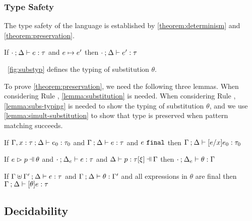 \subsubsection{Type Safety}
The type safety of the language is established by
\autoref{theorem:determinism} and \autoref{theorem:preservation}.

\begin{theorem}[Preservation]
  \label{theorem:preservation}
  If $\cdot \mathbin{;} \Delta \vdash e : \tau$ and $e \mapsto e'$
  then $\cdot \mathbin{;} \Delta \vdash e' : \tau$
\end{theorem}



\figurename~\ref{fig:substyp} defines the typing of substitution $\theta$.

To prove \autoref{theorem:preservation}, we need the following three lemmas.
When considering Rule \ITAp, \autoref{lemma:substitution} is needed.
When considering Rule \ITSuccMatch, \autoref{lemma:subs-typing} is needed
to show the typing of substitution $\theta$, and we use
\autoref{lemma:simult-substitution} to show that type is preserved when pattern
matching succeeds.

\begin{lemma}[Substitution]
  \label{lemma:substitution}
  If $\Gamma, x : \tau \mathbin{;} \Delta \vdash e_0 : \tau_0$ and $\Gamma \mathbin{;} \Delta \vdash e : \tau$ and $e ~\mathtt{final}$
  then $\Gamma \mathbin{;} \Delta \vdash [e/x]e_0 : \tau_0$
\end{lemma}

\begin{lemma}
  \label{lemma:subs-typing}
  If $\hpatmatch{e}{p}{\theta}$ and $\cdot \mathbin{;} \Delta_e \vdash e : \tau$ and $\chpattyp{p}{\tau}{\xi}{\Gamma}{\Delta}$ then $\cdot \mathbin{;} \Delta_e \vdash \theta : \Gamma$
\end{lemma}

\begin{lemma}
  \label{lemma:simult-substitution}
  If $\Gamma \uplus \Gamma' \mathbin{;} \Delta \vdash e : \tau$ and $\Gamma \mathbin{;} \Delta \vdash \theta : \Gamma'$ and all expressions in $\theta$ are final
  then $\Gamma \mathbin{;} \Delta \vdash [\theta]e : \tau$
\end{lemma}

\subsection{Decidability}\label{sec:algorithm}

